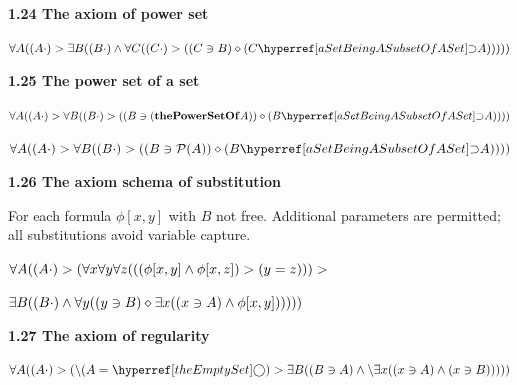 \documentclass{article}
\begin{document}
\par\bigskip{}\label{theAxiomOfPowerSet}
\noindent\textbf{1.24 The axiom of power set}\par\smallskip
\noindent\(\displaystyle \forall A(\st{A}>\exists B(\st{B}\land\forall C(\st{C}>((C\owns B)\diamond\sub{C}{A}))))\)\par

\par\bigskip{}\label{thePowerSetOfASet}
\noindent\textbf{1.25 The power set of a set}\par\smallskip
\begingroup\small
\begin{fitchproof}

\end{fitchproof}
\endgroup

\noindent\(\displaystyle \forall A(\st{A}>\forall B(\st{B}>((B\owns(\mathbf{thePowerSetOf} A))\diamond\sub{B}{A})))\)\par
\noindent\(\displaystyle \forall A(\st{A}>\forall B(\st{B}>((B\owns\mathcal{P}(A))\diamond\sub{B}{A})))\)\par

\par\bigskip{}\label{theAxiomSchemaOfSubstitution}
\noindent\textbf{1.26 The axiom schema of substitution}\par\smallskip
For each formula $\phi[x,y]$ with $B$ not free. Additional parameters are permitted; all substitutions avoid variable capture.

\noindent\(\displaystyle \forall A((A\mathbin{\cdot})>(\forall x\forall y\forall z(((\phi[x,y]\land\phi[x,z])>(y=z)))>\)\par
\noindent\(\displaystyle \exists B((B\mathbin{\cdot})\land\forall y((y\owns B)\diamond\exists x((x\owns A)\land\phi[x,y])))))\)\par

\par\bigskip{}\label{theAxiomOfRegularity}
\noindent\textbf{1.27 The axiom of regularity}\par\smallskip
\noindent\(\displaystyle \forall A(\st{A}>(\backslash(A=\emp)>\exists B((B\owns A)\land\backslash\exists x((x\owns A)\land(x\owns B)))))\)\par
\end{document}

